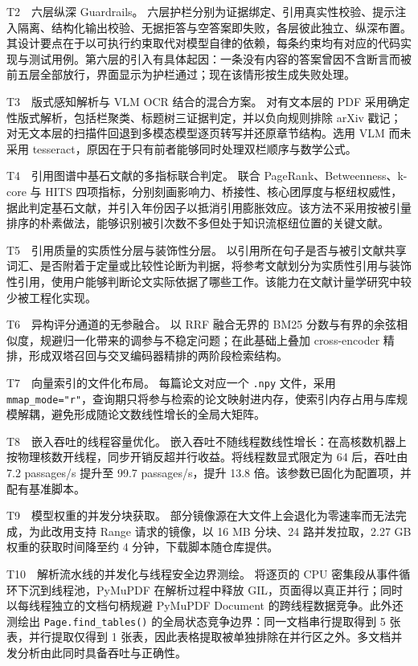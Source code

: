 \documentclass[UTF8,fontset=windows,zihao=5,a4paper]{ctexart}
\begin{document}
T2　六层纵深 Guardrails。 六层护栏分别为证据绑定、引用真实性校验、提示注入隔离、结构化输出校验、无据拒答与空答案即失败，各层彼此独立、纵深布置。其设计要点在于以可执行约束取代对模型自律的依赖，每条约束均有对应的代码实现与测试用例。第六层的引入有具体起因：一条没有内容的答案曾因不含断言而被前五层全部放行，界面显示为护栏通过；现在该情形按生成失败处理。

T3　版式感知解析与 VLM OCR 结合的混合方案。 对有文本层的 PDF 采用确定性版式解析，包括栏聚类、标题树三证据判定，并以负向规则排除 arXiv 戳记；对无文本层的扫描件回退到多模态模型逐页转写并还原章节结构。选用 VLM 而未采用 tesseract，原因在于只有前者能够同时处理双栏顺序与数学公式。

T4　引用图谱中基石文献的多指标联合判定。 联合 PageRank、Betweenness、k-core 与 HITS 四项指标，分别刻画影响力、桥接性、核心团厚度与枢纽权威性，据此判定基石文献，并引入年份因子以抵消引用膨胀效应。该方法不采用按被引量排序的朴素做法，能够识别被引次数不多但处于知识流枢纽位置的关键文献。

T5　引用质量的实质性分层与装饰性分层。 以引用所在句子是否与被引文献共享词汇、是否附着于定量或比较性论断为判据，将参考文献划分为实质性引用与装饰性引用，使用户能够判断论文实际依据了哪些工作。该能力在文献计量学研究中较少被工程化实现。

T6　异构评分通道的无参融合。 以 RRF 融合无界的 BM25 分数与有界的余弦相似度，规避归一化带来的调参与不稳定问题；在此基础上叠加 cross-encoder 精排，形成双塔召回与交叉编码器精排的两阶段检索结构。

T7　向量索引的文件化布局。 每篇论文对应一个 \texttt{.npy} 文件，采用 \texttt{mmap\_\allowbreak{}mode="r"}，查询期只将参与检索的论文映射进内存，使索引内存占用与库规模解耦，避免形成随论文数线性增长的全局大矩阵。

T8　嵌入吞吐的线程容量优化。 嵌入吞吐不随线程数线性增长：在高核数机器上按物理核数开线程，同步开销反超并行收益。将线程数显式限定为 64 后，吞吐由 7.2 passages/s 提升至 99.7 passages/s，提升 13.8 倍。该参数已固化为配置项，并配有基准脚本。

T9　模型权重的并发分块获取。 部分镜像源在大文件上会退化为零速率而无法完成，为此改用支持 Range 请求的镜像，以 16 MB 分块、24 路并发拉取，2.27 GB 权重的获取时间降至约 4 分钟，下载脚本随仓库提供。

T10　解析流水线的并发化与线程安全边界测绘。 将逐页的 CPU 密集段从事件循环下沉到线程池，PyMuPDF 在解析过程中释放 GIL，页面得以真正并行；同时以每线程独立的文档句柄规避 PyMuPDF Document 的跨线程数据竞争。此外还测绘出 \texttt{Page.find\_\allowbreak{}tables()} 的全局状态竞争边界：同一文档串行提取得到 5 张表，并行提取仅得到 1 张表，因此表格提取被单独排除在并行区之外。多文档并发分析由此同时具备吞吐与正确性。
\end{document}

